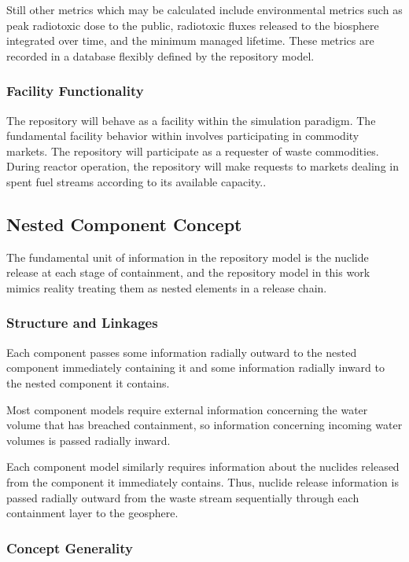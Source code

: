 Still other metrics which may be calculated include environmental metrics 
such as peak radiotoxic dose to the public, radiotoxic fluxes released to the 
biosphere integrated over time, and the minimum managed lifetime.  
These metrics are recorded in a database flexibly defined by the repository 
model.

\subsubsection{Facility Functionality}

The repository will behave as a facility within the \Cyclus simulation 
paradigm. The fundamental facility behavior within \Cyclus involves 
participating in commodity markets. The repository will participate as 
a requester of waste commodities. During reactor operation, the 
repository will make requests to markets dealing in spent fuel streams 
according to its available capacity..

\subsection{Nested Component Concept}

The fundamental unit of information in the repository model is the 
nuclide release at each stage of containment, and the repository model 
in this work mimics reality treating them as nested elements in a 
release chain.


\subsubsection{Structure and Linkages}

Each component passes some information radially outward to the nested 
component immediately containing it and some information radially 
inward to the nested component it contains.

Most component models require external information concerning the 
water volume that has breached containment, so information concerning 
incoming water volumes is passed radially inward. 

Each component model similarly requires information about the nuclides 
released from the component it immediately contains.  Thus, nuclide 
release information is passed radially outward from the waste stream 
sequentially through each containment layer to the geosphere.

\subsubsection{Concept Generality}

